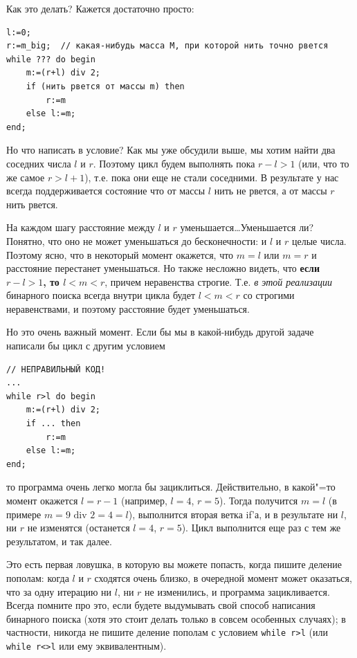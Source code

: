 \documentclass[a4paper,10pt]{problems}
\begin{document}
Как это делать? Кажется достаточно просто:
\begin{codesampleo}\begin{verbatim}
l:=0;
r:=m_big;  // какая-нибудь масса M, при которой нить точно рвется
while ??? do begin    
    m:=(r+l) div 2;
    if (нить рвется от массы m) then
        r:=m
    else l:=m;
end;
\end{verbatim}
\end{codesampleo}
Но что написать в условие? 
Как мы уже обсудили выше, мы хотим найти два соседних числа $l$ и $r$. 
Поэтому цикл будем выполнять пока $r-l>1$ (или, что то же самое $r>l+1$), т.е. пока они еще не стали соседними.
В результате у нас всегда поддерживается состояние что от массы $l$ нить не рвется, а от массы $r$ нить рвется.

На каждом шагу расстояние между $l$ и $r$ уменьшается\dots Уменьшается ли?
Понятно, что оно не может уменьшаться до бесконечности: и $l$ и $r$ целые числа.
Поэтому ясно, что в некоторый момент окажется, что $m=l$ или $m=r$ и расстояние перестанет уменьшаться.
Но также несложно видеть, что \textbf{если $r-l>1$, то $l<m<r$}, причем неравенства строгие. 
Т.е. \textit{в этой реализации} бинарного поиска всегда внутри цикла будет $l<m<r$ со строгими неравенствами,
и поэтому расстояние будет уменьшаться.

Но это очень важный момент. Если бы мы в какой-нибудь другой задаче написали бы цикл с другим условием
\begin{codesampleo}\begin{verbatim}
// НЕПРАВИЛЬНЫЙ КОД!
...
while r>l do begin    
    m:=(r+l) div 2;
    if ... then
        r:=m
    else l:=m;
end;
\end{verbatim}
\end{codesampleo}
то программа очень легко могла бы зациклиться. Действительно, в какой"=то момент окажется $l=r-1$ (например, $l=4$, $r=5$).
Тогда получится $m=l$ (в примере $m=9\mbox{ div } 2=4=l$), выполнится вторая ветка if'а, и в результате ни $l$, ни $r$ не изменятся
(останется $l=4$, $r=5$). Цикл выполнится еще раз с тем же результатом, и так далее.

Это есть первая ловушка, в которую вы можете попасть, когда пишите деление пополам: когда $l$ и $r$ сходятся очень близко, 
в очередной момент может оказаться, что за одну итерацию ни $l$, ни $r$ не изменились, и программа зацикливается.
Всегда помните про это, если будете выдумывать свой способ написания бинарного поиска (хотя это стоит делать только в совсем особенных случаях);
в частности, никогда не пишите деление пополам с условием \verb`while r>l` (или \verb`while r<>l` или ему эквивалентным).
\end{document}
